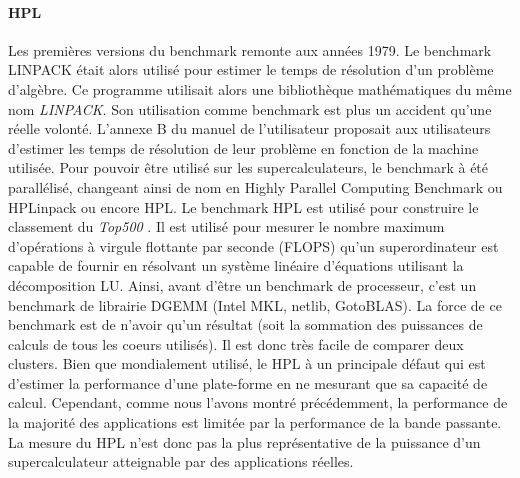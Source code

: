 \paragraph{HPL} Les premières versions du benchmark remonte aux années 1979. Le benchmark LINPACK était alors utilisé pour estimer le temps de résolution d'un problème d'algèbre. Ce programme utilisait alors une bibliothèque mathématiques du même nom \textit{LINPACK}. Son utilisation comme benchmark est plus un accident qu'une réelle volonté. L'annexe B du manuel de l'utilisateur proposait aux utilisateurs d'estimer les temps de résolution de leur problème en fonction de la machine utilisée. Pour pouvoir être utilisé sur les supercalculateurs, le benchmark à été parallélisé, changeant ainsi de nom en Highly Parallel Computing Benchmark ou HPLinpack ou encore HPL.  Le benchmark HPL est utilisé pour construire le  classement du \textit{Top500} \cite{HPC:top500}. Il est utilisé pour mesurer le nombre maximum d'opérations à virgule flottante par seconde (FLOPS) qu'un superordinateur est capable de fournir en résolvant un système linéaire d'équations utilisant la décomposition LU. Ainsi, avant d'être un benchmark de processeur, c'est un benchmark de librairie DGEMM (Intel MKL, netlib, GotoBLAS). La force de ce benchmark est de n'avoir qu'un résultat (soit la sommation des puissances de calculs de tous les coeurs utilisés). Il est donc très facile de comparer deux clusters. Bien que mondialement utilisé, le HPL à un principale défaut qui est d'estimer la performance d'une plate-forme en ne mesurant que sa capacité de calcul. Cependant, comme nous l'avons montré précédemment, la performance de la majorité des applications est limitée par la performance de la bande passante. La mesure du HPL n'est donc pas la plus représentative de la puissance d'un supercalculateur atteignable par des applications réelles. 




